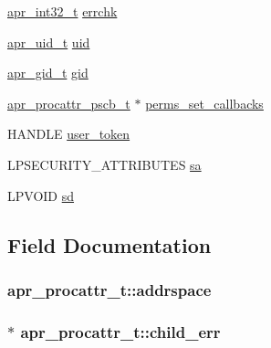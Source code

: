 \begin{DoxyCompactItemize}
\item 
\hyperlink{group__apr__platform_ga21ef1e35fd3ff9be386f3cb20164ff02}{apr\+\_\+int32\+\_\+t} \hyperlink{structapr__procattr__t_a16163057dbd92ddf9f91bf7fc8999c18}{errchk}
\item 
\hyperlink{group__apr__user_gad1aa508f584bc230acf4f68ba4fc4de7}{apr\+\_\+uid\+\_\+t} \hyperlink{structapr__procattr__t_aab58995d64f21273fd92b102a38ca05f}{uid}
\item 
\hyperlink{group__apr__user_ga22e9e224e984f837f3e276833e2f3a55}{apr\+\_\+gid\+\_\+t} \hyperlink{structapr__procattr__t_a6c1fc0bb1a36b76b819f6134da011790}{gid}
\item 
\hyperlink{structapr__procattr__pscb__t}{apr\+\_\+procattr\+\_\+pscb\+\_\+t} $\ast$ \hyperlink{structapr__procattr__t_a65de307cd25ccc1746653cc8cf89124f}{perms\+\_\+set\+\_\+callbacks}
\item 
H\+A\+N\+D\+LE \hyperlink{structapr__procattr__t_a5c318dfdfa4357ca018ff85293296240}{user\+\_\+token}
\item 
L\+P\+S\+E\+C\+U\+R\+I\+T\+Y\+\_\+\+A\+T\+T\+R\+I\+B\+U\+T\+ES \hyperlink{structapr__procattr__t_a88d162b7f107f67a7eb65b5d6a743186}{sa}
\item 
L\+P\+V\+O\+ID \hyperlink{structapr__procattr__t_a6360d8d5d8b3ab841ccfbab8e3172960}{sd}
\end{DoxyCompactItemize}


\subsection{Field Documentation}
\subsubsection[{\texorpdfstring{addrspace}{addrspace}}]{ apr\+\_\+procattr\+\_\+t\+::addrspace}\hypertarget{structapr__procattr__t_a7ed0386d21108c46e0c99a72cfed17ce}{}\label{structapr__procattr__t_a7ed0386d21108c46e0c99a72cfed17ce}
\subsubsection[{\texorpdfstring{child\+\_\+err}{child_err}}]{ $\ast$ apr\+\_\+procattr\+\_\+t\+::child\+\_\+err}\hypertarget{structapr__procattr__t_a06d5eabe54ead0ae2517c65aec6c6a2a}{}\label{structapr__procattr__t_a06d5eabe54ead0ae2517c65aec6c6a2a}
